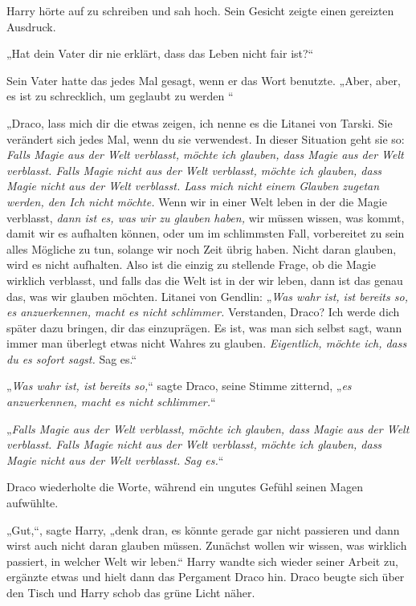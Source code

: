 {Harry hörte auf zu schreiben und sah hoch. Sein Gesicht zeigte einen gereizten Ausdruck.

„Hat dein Vater dir nie erklärt, dass das Leben nicht fair ist?“

Sein Vater hatte das jedes Mal gesagt, wenn er das Wort benutzte. „Aber, aber, es ist zu schrecklich, um geglaubt zu werden \later“

„Draco, lass mich dir die etwas zeigen, ich nenne es die Litanei von Tarski. Sie verändert sich jedes Mal, wenn du sie verwendest. In dieser Situation geht sie so: \emph{Falls Magie aus der Welt verblasst, möchte ich glauben, dass Magie aus der Welt verblasst. Falls Magie nicht aus der Welt verblasst, möchte ich glauben, dass Magie nicht aus der Welt verblasst. Lass mich nicht einem Glauben zugetan werden, den Ich nicht möchte.} Wenn wir in einer Welt leben in der die Magie verblasst, \emph{dann ist es, was wir zu glauben haben,} wir müssen wissen, was kommt, damit wir es aufhalten können, oder um im schlimmsten Fall, vorbereitet zu sein alles Mögliche zu tun, solange wir noch Zeit übrig haben. Nicht daran glauben, wird es nicht aufhalten. Also ist die einzig zu stellende Frage, ob die Magie wirklich verblasst, und falls das die Welt ist in der wir leben, dann ist das genau das, was wir glauben möchten. Litanei von Gendlin: „\emph{Was wahr ist, ist bereits so, es anzuerkennen, macht es nicht schlimmer.} Verstanden, Draco? Ich werde dich später dazu bringen, dir das einzuprägen. Es ist, was man sich selbst sagt, wann immer man überlegt etwas nicht Wahres zu glauben. \emph{Eigentlich, möchte ich, dass du es sofort sagst.} Sag es.“

„\emph{Was wahr ist, ist bereits so,}“ sagte Draco, seine Stimme zitternd, „\emph{es anzuerkennen, macht es nicht schlimmer.}“

„\emph{Falls Magie aus der Welt verblasst, möchte ich glauben, dass Magie aus der Welt verblasst. Falls Magie nicht aus der Welt verblasst, möchte ich glauben, dass Magie nicht aus der Welt verblasst.} \emph{Sag es.}“

Draco wiederholte die Worte, während ein ungutes Gefühl seinen Magen aufwühlte.

„Gut,“, sagte Harry, „denk dran, es könnte gerade gar nicht passieren und dann wirst auch nicht daran glauben müssen. Zunächst wollen wir wissen, was wirklich passiert, in welcher Welt wir leben.“ Harry wandte sich wieder seiner Arbeit zu, ergänzte etwas und hielt dann das Pergament Draco hin. Draco beugte sich über den Tisch und Harry schob das grüne Licht näher.

}
